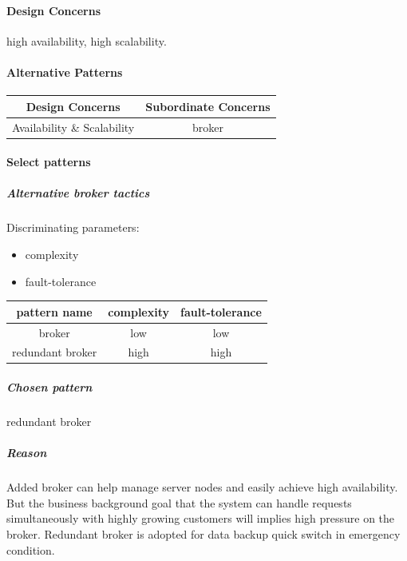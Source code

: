 \documentclass{article}
\begin{document}
			\paragraph{Design Concerns} high availability, high scalability.
			\paragraph{Alternative Patterns}
			\begin{center}
				\begin{tabular}{|c|c|}
					\hline
					Design Concerns & Subordinate Concerns\\
					\hline 
					Availability \& Scalability & broker\\
					\hline
				\end{tabular}
			\end{center}
			\paragraph{Select patterns}
			\subparagraph{Alternative broker tactics}
			Discriminating parameters:\\
			\begin{itemize}
				\item complexity
				\item fault-tolerance
			\end{itemize}
			\begin{center}
				\begin{tabular}{|c|c|c|}
					\hline
					pattern name & complexity & fault-tolerance\\
					\hline
					broker& low& low\\
					\hline
					redundant broker& high& high\\
					\hline
				\end{tabular}
			\end{center}
			\subparagraph{Chosen pattern} 
			redundant broker
			\subparagraph{Reason} 
			Added broker can help manage server nodes and easily achieve high availability. But the business background goal that the system can handle requests simultaneously with highly growing customers will implies high pressure on the broker. Redundant broker is adopted for data backup quick switch in emergency condition. 
\end{document}
